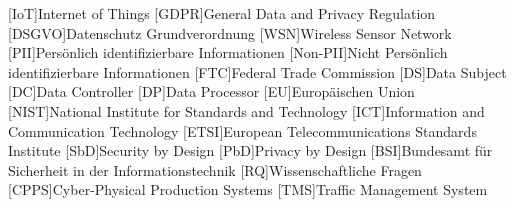 

\begin{acronym}[DSGVO]

[IoT]{Internet of Things}
[GDPR]{General Data and Privacy Regulation}
[DSGVO]{Datenschutz Grundverordnung}
[WSN]{Wireless Sensor Network}
[PII]{Persönlich identifizierbare Informationen}
[Non-PII]{Nicht Persönlich identifizierbare Informationen}
[FTC]{Federal Trade Commission}
[DS]{Data Subject}
[DC]{Data Controller}
[DP]{Data Processor}
[EU]{Europäischen Union}
[NIST]{National Institute for Standards and Technology}
[ICT]{Information and Communication Technology}
[ETSI]{European Telecommunications Standards Institute}
[SbD]{Security by Design}
[PbD]{Privacy by Design}
[BSI]{Bundesamt für Sicherheit in der Informationstechnik}
[RQ]{Wissenschaftliche Fragen}
[CPPS]{Cyber-Physical Production Systems}
[TMS]{Traffic Management System}

\end{acronym}